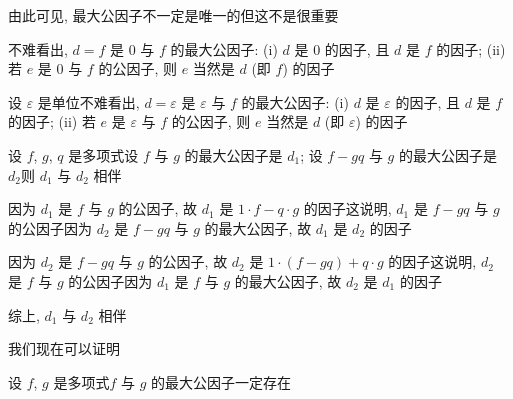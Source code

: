 \begin{remark}
    由此可见, 最大公因子不一定是唯一的\period 但这不是很重要\period
\end{remark}

\begin{example}
    不难看出, $d = f$ 是 $0$ 与 $f$ 的最大公因子: (i) $d$ 是 $0$ 的因子, 且 $d$ 是 $f$ 的因子; (ii) 若 $e$ 是 $0$ 与 $f$ 的公因子, 则 $e$ 当然是 $d$ (即 $f$) 的因子\period
\end{example}

\begin{example}
    设 $\varepsilon$ 是单位\period 不难看出, $d = \varepsilon$ 是 $\varepsilon$ 与 $f$ 的最大公因子: (i) $d$ 是 $\varepsilon$ 的因子, 且 $d$ 是 $f$ 的因子; (ii) 若 $e$ 是 $\varepsilon$ 与 $f$ 的公因子, 则 $e$ 当然是 $d$ (即 $\varepsilon$) 的因子\period
\end{example}

\begin{proposition}
    设 $f$, $g$, $q$ 是多项式\period 设 $f$ 与 $g$ 的最大公因子是 $d_1$; 设 $f - gq$ 与 $g$ 的最大公因子是 $d_2$\period 则 $d_1$ 与 $d_2$ 相伴\period
\end{proposition}

\begin{pf}
    因为 $d_1$ 是 $f$ 与 $g$ 的公因子, 故 $d_1$ 是 $1 \cdot f - q \cdot g$ 的因子\period 这说明, $d_1$ 是 $f - gq$ 与 $g$ 的公因子\period 因为 $d_2$ 是 $f - gq$ 与 $g$ 的最大公因子, 故 $d_1$ 是 $d_2$ 的因子\period

    因为 $d_2$ 是 $f - gq$ 与 $g$ 的公因子, 故 $d_2$ 是 $1 \cdot (f - gq) + q \cdot g$ 的因子\period 这说明, $d_2$ 是 $f$ 与 $g$ 的公因子\period 因为 $d_1$ 是 $f$ 与 $g$ 的最大公因子, 故 $d_2$ 是 $d_1$ 的因子\period

    综上, $d_1$ 与 $d_2$ 相伴\period
\end{pf}

我们现在可以证明
\begin{proposition}
    设 $f$, $g$ 是多项式\period $f$ 与 $g$ 的最大公因子一定存在\period
\end{proposition}

